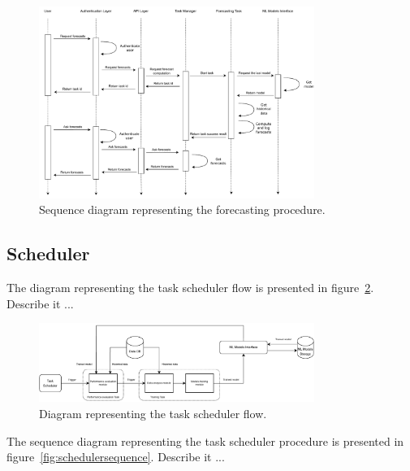 \begin{figure}[H]
\centering 
\includegraphics[width=0.8\textwidth]{images/architecture_forecasting_sequence}
\caption{Sequence diagram representing the forecasting procedure.}
\label{fig:forecastingsequence}
\end{figure}


\vspace{0.1 cm}
\subsection{Scheduler}
\label{sec:loading}
\vspace{0.1 cm}

The diagram representing the task scheduler flow is presented in figure~\ref{fig:schedulerflow}.
Describe it ...

\begin{figure}[H]
\centering 
\includegraphics[width=0.8\textwidth]{images/architecture_scheduler_flow}
\caption{Diagram representing the task scheduler flow.}
\label{fig:schedulerflow}
\end{figure}

The sequence diagram representing the task scheduler procedure is presented in figure~\ref{fig:schedulersequence}.
Describe it ...

